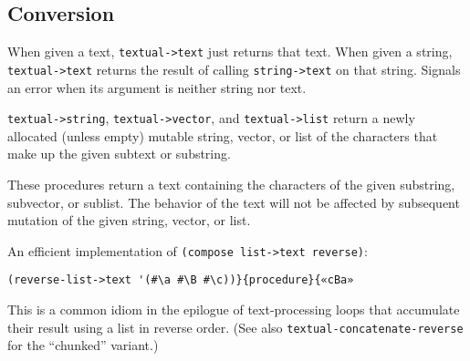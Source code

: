 \subsection{{Conversion}}\label{conversion}

\begin{entry}{%
  }

  
When given a text, \texttt{textual->text} just returns that text. When
given a string, \texttt{textual->text} returns the result of calling
\texttt{string->text} on that string.  Signals an error when its
argument is neither string nor text.
\end{entry}

\begin{entry}{%
  }

  
  \texttt{textual->string}, \texttt{textual->vector}, and
  \texttt{textual->list} return a newly allocated (unless empty)
  mutable string, vector, or list of the characters that make up the
  given subtext or substring.
\end{entry}

\begin{entry}{%
  }

  These
  procedures return a text containing the characters of the given
  substring, subvector, or sublist. The behavior of the text will not
  be affected by subsequent mutation of the given string, vector, or
  list.
\end{entry}

\begin{entry}{%
  }

  An
  efficient implementation of \texttt{(compose\ list->text\ reverse)}:

\begin{verbatim}
(reverse-list->text '(#\a #\B #\c))}{procedure}{«cBa»
\end{verbatim}

  This is a common idiom in the epilogue of text-processing loops that
  accumulate their result using a list in reverse order. (See also
  \texttt{textual-concatenate-reverse} for the ``chunked'' variant.)
\end{entry}

